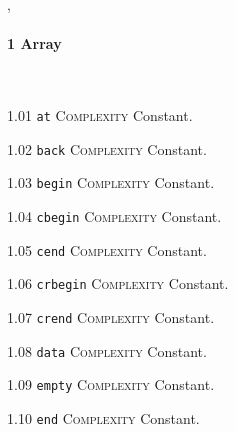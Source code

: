 
\sep
{}
\paragraph{1 Array}\mbox{}\\
\noindent\textcolor{cgreen}{1.01 \texttt{at}} \textsc{Complexity} Constant. \vspace{0.5em}

\noindent\textcolor{cgreen}{1.02 \texttt{back}} \textsc{Complexity} Constant. \vspace{0.5em}

\noindent\textcolor{cgreen}{1.03 \texttt{begin}} \textsc{Complexity} Constant. \vspace{0.5em}

\noindent\textcolor{cgreen}{1.04 \texttt{cbegin}} \textsc{Complexity} Constant. \vspace{0.5em}

\noindent\textcolor{cgreen}{1.05 \texttt{cend}} \textsc{Complexity} Constant. \vspace{0.5em}

\noindent\textcolor{cgreen}{1.06 \texttt{crbegin}} \textsc{Complexity} Constant. \vspace{0.5em}

\noindent\textcolor{cgreen}{1.07 \texttt{crend}} \textsc{Complexity} Constant. \vspace{0.5em}

\noindent\textcolor{cgreen}{1.08 \texttt{data}} \textsc{Complexity} Constant. \vspace{0.5em}

\noindent\textcolor{cgreen}{1.09 \texttt{empty}} \textsc{Complexity} Constant. \vspace{0.5em}

\noindent\textcolor{cgreen}{1.10 \texttt{end}} \textsc{Complexity} Constant. \vspace{0.5em}

